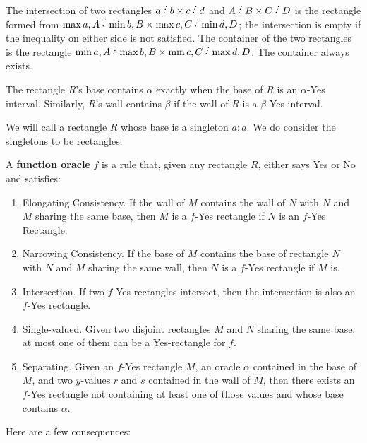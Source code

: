 \documentclass[12pt]{article}
\theoremstyle{remark}
\begin{document}
The intersection of two rectangles $a \lte b \times c \lte d$ and $A \lte B \times C \lte D$ is the rectangle formed from $\max{a,A} \lte \min{b,B} \times \max{c, C} \lte \min{d, D}$; the intersection is empty if the inequality on either side is not satisfied. The container of the two rectangles is the rectangle $\min{a,A} \lte \max{b,B} \times \min{c, C} \lte \max{d, D}$. The container always exists. 


The rectangle $R$'s base contains $\alpha$ exactly when the base of $R$ is an $\alpha$-Yes interval. Similarly, $R$'s wall contains $\beta$ if the wall of $R$ is a $\beta$-Yes interval.

We will call a rectangle $R$ whose base is  a singleton $a:a$. We do consider the singletons to be rectangles.

A \textbf{function oracle} $f$ is a rule that, given any rectangle $R$, either says Yes or No and satisfies: 
\begin{enumerate}
    \item Elongating Consistency. If the wall of $M$ contains the wall of $N$ with $N$ and $M$ sharing the same base, then $M$ is a $f$-Yes rectangle if $N$  is an $f$-Yes Rectangle. 
    \item Narrowing Consistency. If the base of  $M$ contains the base of rectangle $N$ with $N$ and $M$ sharing the same wall, then $N$ is a $f$-Yes rectangle if $M$ is. 
    \item Intersection. If two $f$-Yes rectangles intersect, then the intersection is also an $f$-Yes rectangle. 
    \item Single-valued. Given two disjoint rectangles $M$ and $N$ sharing the same base, at most one of them can be a Yes-rectangle for $f$. 
    \item Separating. Given an $f$-Yes rectangle $M$, an oracle $\alpha$ contained in the base of $M$, and two $y$-values $r$ and $s$ contained in the wall of $M$, then there exists an $f$-Yes rectangle not containing at least one of those values and whose base contains $\alpha$.
\end{enumerate} 

Here are a few consequences: 
\end{document}
